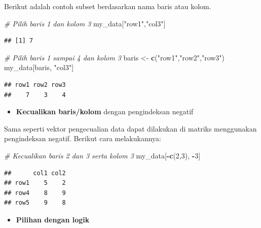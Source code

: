 \documentclass[
]{book}
\newenvironment{Shaded}{\begin{snugshade}}{\end{snugshade}}
\newcommand{\CommentTok}[1]{\textcolor[rgb]{0.56,0.35,0.01}{\textit{#1}}}
\newcommand{\DecValTok}[1]{\textcolor[rgb]{0.00,0.00,0.81}{#1}}
\newcommand{\FunctionTok}[1]{\textcolor[rgb]{0.13,0.29,0.53}{\textbf{#1}}}
\newcommand{\NormalTok}[1]{#1}
\newcommand{\OtherTok}[1]{\textcolor[rgb]{0.56,0.35,0.01}{#1}}
\newcommand{\SpecialCharTok}[1]{\textcolor[rgb]{0.81,0.36,0.00}{\textbf{#1}}}
\newcommand{\StringTok}[1]{\textcolor[rgb]{0.31,0.60,0.02}{#1}}
\providecommand{\tightlist}{%
  \setlength{\itemsep}{0pt}\setlength{\parskip}{0pt}}
\theoremstyle{definition}
\theoremstyle{definition}
\theoremstyle{definition}
\theoremstyle{definition}
\theoremstyle{remark}
\begin{document}
Berikut adalah contoh subset berdasarkan nama baris atau kolom.

\begin{Shaded}
\begin{Highlighting}[]
\CommentTok{\# Pilih baris 1 dan kolom 3}
\NormalTok{my\_data[}\StringTok{"row1"}\NormalTok{,}\StringTok{"col3"}\NormalTok{]}
\end{Highlighting}
\end{Shaded}

\begin{verbatim}
## [1] 7
\end{verbatim}

\begin{Shaded}
\begin{Highlighting}[]
\CommentTok{\# Pilih baris 1 sampai 4 dan kolom 3}
\NormalTok{baris }\OtherTok{\textless{}{-}} \FunctionTok{c}\NormalTok{(}\StringTok{"row1"}\NormalTok{,}\StringTok{"row2"}\NormalTok{,}\StringTok{"row3"}\NormalTok{)}
\NormalTok{my\_data[baris, }\StringTok{"col3"}\NormalTok{]}
\end{Highlighting}
\end{Shaded}

\begin{verbatim}
## row1 row2 row3 
##    7    3    4
\end{verbatim}

\begin{itemize}
\tightlist
\item
  \textbf{Kecualikan baris/kolom} dengan pengindeksan negatif
\end{itemize}

Sama seperti vektor pengecualian data dapat dilakukan di matriks menggunakan pengindeksan negatif. Berikut cara melakukannya:

\begin{Shaded}
\begin{Highlighting}[]
\CommentTok{\# Kecualikan baris 2 dan 3 serta kolom 3}
\NormalTok{my\_data[}\SpecialCharTok{{-}}\FunctionTok{c}\NormalTok{(}\DecValTok{2}\NormalTok{,}\DecValTok{3}\NormalTok{), }\SpecialCharTok{{-}}\DecValTok{3}\NormalTok{]}
\end{Highlighting}
\end{Shaded}

\begin{verbatim}
##      col1 col2
## row1    5    2
## row4    8    9
## row5    9    8
\end{verbatim}

\begin{itemize}
\tightlist
\item
  \textbf{Pilihan dengan logik}
\end{itemize}
\end{document}
